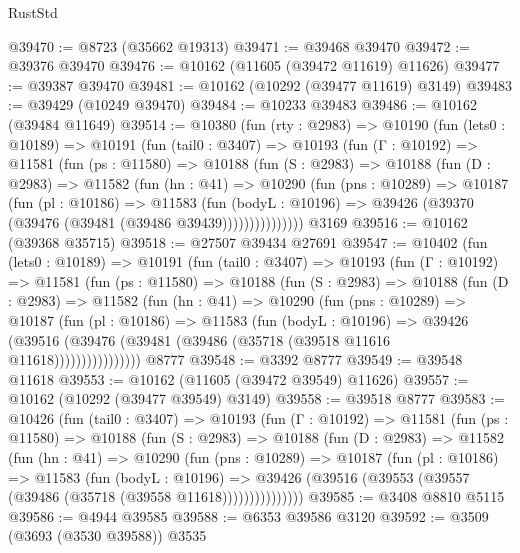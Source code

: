 \begin{lexlean}{RustStd}
\begin{coremodule}
@39470 := @8723 (@35662 @19313)
@39471 := @39468 @39470
@39472 := @39376 @39470
@39476 := @10162 (@11605 (@39472 @11619) @11626)
@39477 := @39387 @39470
@39481 := @10162 (@10292 (@39477 @11619) @3149)
@39483 := @39429 (@10249 @39470)
@39484 := @10233 @39483
@39486 := @10162 (@39484 @11649)
@39514 := @10380
    (fun (rty : @2983) =>
    @10190
      (fun (lets0 : @10189) =>
      @10191
        (fun (tail0 : @3407) =>
        @10193
          (fun (Γ : @10192) =>
          @11581
            (fun (ps : @11580) =>
            @10188
              (fun (S : @2983) =>
              @10188
                (fun (D : @2983) =>
                @11582
                  (fun (hn : @41) =>
                  @10290
                    (fun (pns : @10289) =>
                    @10187
                      (fun (pl : @10186) =>
                      @11583
                        (fun (bodyL : @10196) =>
                        @39426 (@39370 (@39476 (@39481 (@39486 @39439)))))))))))))))
    @3169
@39516 := @10162 (@39368 @35715)
@39518 := @27507 @39434 @27691
@39547 := @10402
    (fun (lets0 : @10189) =>
    @10191
      (fun (tail0 : @3407) =>
      @10193
        (fun (Γ : @10192) =>
        @11581
          (fun (ps : @11580) =>
          @10188
            (fun (S : @2983) =>
            @10188
              (fun (D : @2983) =>
              @11582
                (fun (hn : @41) =>
                @10290
                  (fun (pns : @10289) =>
                  @10187
                    (fun (pl : @10186) =>
                    @11583
                      (fun (bodyL : @10196) =>
                      @39426
                        (@39516
                          (@39476 (@39481 (@39486 (@35718 (@39518 @11616 @11618))))))))))))))))
    @8777
@39548 := @3392 @8777
@39549 := @39548 @11618
@39553 := @10162 (@11605 (@39472 @39549) @11626)
@39557 := @10162 (@10292 (@39477 @39549) @3149)
@39558 := @39518 @8777
@39583 := @10426
    (fun (tail0 : @3407) =>
    @10193
      (fun (Γ : @10192) =>
      @11581
        (fun (ps : @11580) =>
        @10188
          (fun (S : @2983) =>
          @10188
            (fun (D : @2983) =>
            @11582
              (fun (hn : @41) =>
              @10290
                (fun (pns : @10289) =>
                @10187
                  (fun (pl : @10186) =>
                  @11583
                    (fun (bodyL : @10196) =>
                    @39426 (@39516 (@39553 (@39557 (@39486 (@35718 (@39558 @11618)))))))))))))))
@39585 := @3408 @8810 @5115
@39586 := @4944 @39585
@39588 := @6353 @39586 @3120
@39592 := @3509 (@3693 (@3530 @39588)) @3535

\end{coremodule}
\end{lexlean}
